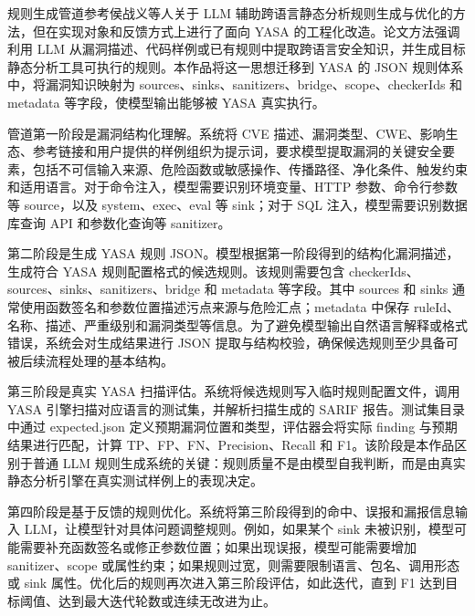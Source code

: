 \documentclass[a4paper,12pt,UTF8]{ctexart}
\numberwithin{figure}{section}
\numberwithin{table}{section}
\numberwithin{equation}{section}
\begin{document}
{\songti
规则生成管道参考侯战义等人关于 LLM 辅助跨语言静态分析规则生成与优化的方法，但在实现对象和反馈方式上进行了面向 YASA 的工程化改造。论文方法强调利用 LLM 从漏洞描述、代码样例或已有规则中提取跨语言安全知识，并生成目标静态分析工具可执行的规则。本作品将这一思想迁移到 YASA 的 JSON 规则体系中，将漏洞知识映射为 sources、sinks、sanitizers、bridge、scope、checkerIds 和 metadata 等字段，使模型输出能够被 YASA 真实执行。

管道第一阶段是漏洞结构化理解。系统将 CVE 描述、漏洞类型、CWE、影响生态、参考链接和用户提供的样例组织为提示词，要求模型提取漏洞的关键安全要素，包括不可信输入来源、危险函数或敏感操作、传播路径、净化条件、触发约束和适用语言。对于命令注入，模型需要识别环境变量、HTTP 参数、命令行参数等 source，以及 system、exec、eval 等 sink；对于 SQL 注入，模型需要识别数据库查询 API 和参数化查询等 sanitizer。

第二阶段是生成 YASA 规则 JSON。模型根据第一阶段得到的结构化漏洞描述，生成符合 YASA 规则配置格式的候选规则。该规则需要包含 checkerIds、sources、sinks、sanitizers、bridge 和 metadata 等字段。其中 sources 和 sinks 通常使用函数签名和参数位置描述污点来源与危险汇点；metadata 中保存 ruleId、名称、描述、严重级别和漏洞类型等信息。为了避免模型输出自然语言解释或格式错误，系统会对生成结果进行 JSON 提取与结构校验，确保候选规则至少具备可被后续流程处理的基本结构。

第三阶段是真实 YASA 扫描评估。系统将候选规则写入临时规则配置文件，调用 YASA 引擎扫描对应语言的测试集，并解析扫描生成的 SARIF 报告。测试集目录中通过 expected.json 定义预期漏洞位置和类型，评估器会将实际 finding 与预期结果进行匹配，计算 TP、FP、FN、Precision、Recall 和 F1。该阶段是本作品区别于普通 LLM 规则生成系统的关键：规则质量不是由模型自我判断，而是由真实静态分析引擎在真实测试样例上的表现决定。

第四阶段是基于反馈的规则优化。系统将第三阶段得到的命中、误报和漏报信息输入 LLM，让模型针对具体问题调整规则。例如，如果某个 sink 未被识别，模型可能需要补充函数签名或修正参数位置；如果出现误报，模型可能需要增加 sanitizer、scope 或属性约束；如果规则过宽，则需要限制语言、包名、调用形态或 sink 属性。优化后的规则再次进入第三阶段评估，如此迭代，直到 F1 达到目标阈值、达到最大迭代轮数或连续无改进为止。
\par}
\end{document}
